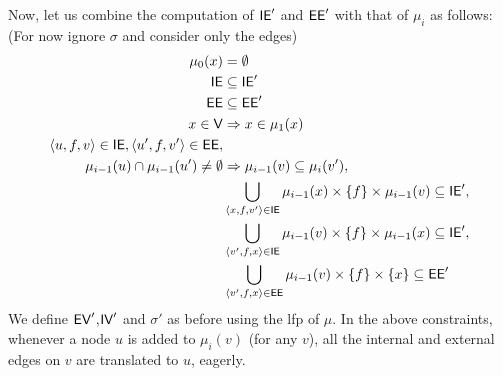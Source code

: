 \documentclass[12pt]{article}
\begin{document}
Now, let us combine the computation of $\mathsf{IE}'$ and $\mathsf{EE}'$  with that of $\mu_i$  as follows:
(For now ignore $\sigma$ and consider only the edges)
%
\begin{align}
\mu_0(x) &= \emptyset \\
\mathsf{IE} 	 & \subseteq \mathsf{IE}' \\
\mathsf{EE} 	 & \subseteq \mathsf{EE}' \\
x \in \mathsf{V} & \Rightarrow  x \in \mu_1(x) \\
\nonumber
\langle u,f,v \rangle \in \mathsf{IE}, \langle u',f,v' \rangle \in \mathsf{EE}, \\
\nonumber
\mu_{i-1}(u) \cap \mu_{i-1}(u') \ne \emptyset  & \Rightarrow \mu_{i-1}(v) \subseteq \mu_i(v'),  \\
\nonumber
& \bigcup_{\langle x,f,v' \rangle \in \mathsf{IE}} \mu_{i-1}(x) \times \{ f \} \times \mu_{i-1}(v) \subseteq \mathsf{IE}', \\
\nonumber
& \bigcup_{\langle v',f,x \rangle \in \mathsf{IE}} \mu_{i-1}(v) \times \{ f \} \times \mu_{i-1}(x) \subseteq \mathsf{IE}', \\
& \bigcup_{\langle v',f,x \rangle \in \mathsf{EE}} \mu_{i-1}(v) \times \{ f \} \times \{  x \} \subseteq \mathsf{EE}' 
\label{eq:new-alias}
\end{align}
%
We define $\mathsf{EV}'$,$\mathsf{IV}'$ and $\sigma'$ as before using the lfp of $\mu$.
In the above constraints, whenever a node $u$ is added to $\mu_i(v)$ (for any $v$), 
all the internal and external edges on $v$ are  translated to $u$, eagerly.
\end{document}
